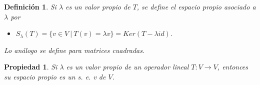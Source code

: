 \documentclass[12pt]{book}
\newtheorem{defi}{Definici\'on}
\newtheorem{prop}{Propiedad}
\def\K{\mathbb{K}}
\begin{document}
\vspace{0.5 cm}

\begin{defi}
Si $\lambda$ es un valor propio de $T$, se define el \emph{espacio propio asociado a $\lambda$} por
\begin{itemize}
\item $S_\lambda(T)=\{ v\in V\ |\ T(v)=\lambda v\}=Ker(T-\lambda id)$.
\end{itemize}
Lo análogo se define para matrices cuadradas.
\end{defi}

\begin{prop}
Si $\lambda$ es un valor propio de un operador lineal $T:V\rightarrow V$, entonces su espacio propio es un s. e. v de $V$.
\end{prop}

\end{document}
